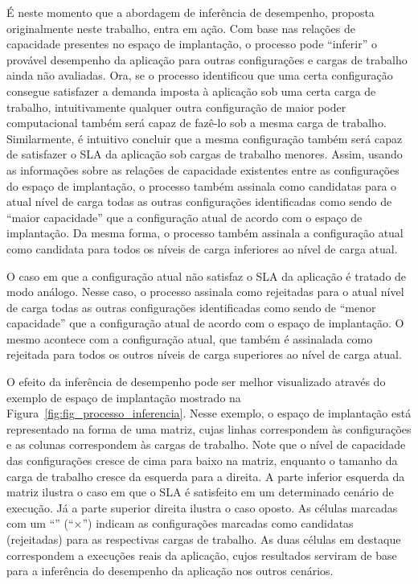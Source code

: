 \documentclass[10pt,conference,compsocconf]{IEEEtran}
\begin{document}
É neste momento que a abordagem de inferência de desempenho, proposta originalmente neste trabalho, entra em ação. Com base nas relações de capacidade presentes no espaço de implantação, o processo pode ``inferir'' o provável desempenho da aplicação para outras configurações e cargas de trabalho ainda não avaliadas. Ora, se o processo identificou que uma certa configuração consegue satisfazer a demanda imposta à aplicação sob uma certa carga de trabalho, intuitivamente qualquer outra configuração de maior poder computacional também será capaz de fazê-lo sob a mesma carga de trabalho. Similarmente, é intuitivo concluir que a mesma configuração também será capaz de satisfazer o SLA da aplicação sob cargas de trabalho menores. Assim, usando as informações sobre as relações de capacidade existentes entre as configurações do espaço de implantação, o processo também assinala como candidatas para o atual nível de carga todas as outras configurações identificadas como sendo de ``maior capacidade'' que a configuração atual de acordo com o espaço de implantação. Da mesma forma, o processo também assinala a configuração atual como candidata para todos os níveis de carga inferiores ao nível de carga atual.

O caso em que a configuração atual não satisfaz o SLA  da aplicação é tratado de modo análogo. Nesse caso, o processo assinala como rejeitadas para o atual nível de carga todas as outras configurações identificadas como sendo de ``menor capacidade'' que a configuração atual de acordo com o espaço de implantação. O mesmo acontece com a configuração atual, que também é assinalada como rejeitada para todos os outros níveis de carga superiores ao nível de carga atual.


O efeito da inferência de desempenho pode ser melhor visualizado através do exemplo de espaço de implantação mostrado na Figura~\ref{fig:fig_processo_inferencia}. Nesse exemplo, o espaço de implantação está representado na forma de uma matriz, cujas linhas correspondem às configurações e as colunas correspondem às cargas de trabalho. Note que o nível de capacidade das configurações cresce de cima para baixo na matriz, enquanto o tamanho da carga de trabalho cresce da esquerda para a direita. A parte inferior esquerda da matriz ilustra o caso em que o SLA é satisfeito em um determinado cenário de execução. Já a parte superior direita ilustra o caso oposto. As células marcadas com um ``{\scriptsize \raisebox{0.4ex}{\boldmath$\surd{}\,$}}'' (``\boldmath$\times{}$'') indicam as configurações marcadas como candidatas (rejeitadas) para as respectivas cargas de trabalho. As duas células em destaque correspondem a execuções reais da aplicação, cujos resultados serviram de base para a inferência do desempenho da aplicação nos outros cenários. 
\end{document}
